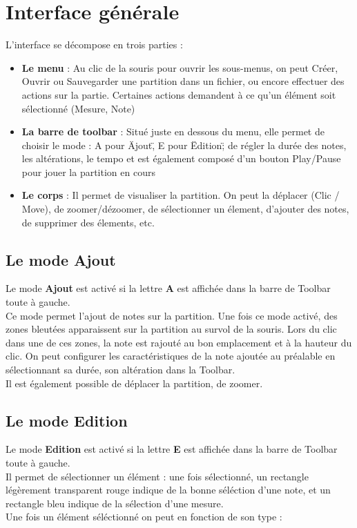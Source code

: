\documentclass[12pt]{report}
\begin{document}
\section{Interface générale}
L'interface se décompose en trois parties :\\
\begin{itemize}
 \item \textbf{Le menu} : Au clic de la souris pour ouvrir les sous-menus, on peut Créer, Ouvrir ou Sauvegarder une partition dans un fichier, ou encore effectuer des actions sur la partie. Certaines actions
 demandent à ce qu'un élément soit sélectionné (Mesure, Note)  \\
 \item \textbf{La barre de toolbar} : Situé juste en dessous du menu, elle permet de choisir le mode : A pour \"Ajout\", E pour \"Edition\"; de régler la durée des notes, les altérations, le tempo et est
 également composé d'un bouton Play/Pause pour jouer la partition en cours \\
 \item \textbf{Le corps} : Il permet de visualiser la partition. On peut la déplacer (Clic / Move), de zoomer/dézoomer, de sélectionner un élement, d'ajouter des notes, de supprimer des élements, etc.\\
\end{itemize}

\subsection{Le mode Ajout}
Le mode \textbf{Ajout} est activé si la lettre \textbf{A} est affichée dans la barre de Toolbar toute à gauche.\\
Ce mode permet l'ajout de notes sur la partition. Une fois ce mode activé, des zones bleutées apparaissent sur la partition au survol de la souris. Lors du clic dans une de ces zones, la note est rajouté
au bon emplacement et à la hauteur du clic. On peut configurer les caractéristiques de la note ajoutée au préalable en sélectionnant sa durée, son altération dans la Toolbar. \\
Il est également possible de déplacer la partition, de zoomer.\\

\subsection{Le mode Edition}
Le mode \textbf{Edition} est activé si la lettre \textbf{E} est affichée dans la barre de Toolbar toute à gauche.\\
Il permet de sélectionner un élément : une fois sélectionné, un rectangle légèrement transparent rouge indique de la bonne séléction d'une note, et un rectangle bleu indique de la sélection d'une mesure.\\
Une fois un élément séléctionné on peut en fonction de son type : \\
\end{document}
